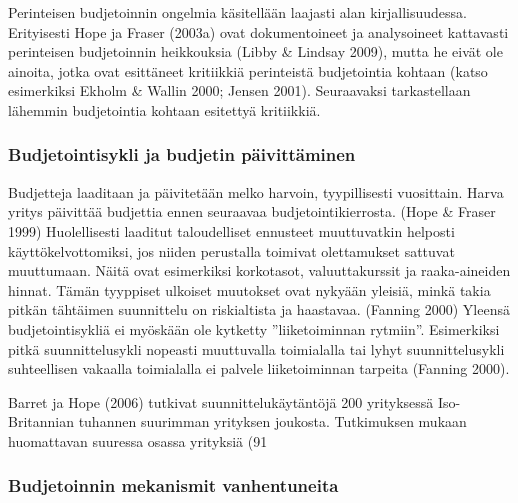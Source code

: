 \documentclass[12pt,a4paper,oneside,pdftex]{report}
\begin{document}
Perinteisen budjetoinnin ongelmia käsitellään laajasti alan kirjallisuudessa. Erityisesti Hope ja Fraser (2003a) ovat dokumentoineet ja analysoineet kattavasti perinteisen budjetoinnin heikkouksia (Libby & Lindsay 2009), mutta he eivät ole ainoita, jotka ovat esittäneet kritiikkiä perinteistä budjetointia kohtaan (katso esimerkiksi Ekholm & Wallin 2000; Jensen 2001). Seuraavaksi tarkastellaan lähemmin budjetointia kohtaan esitettyä kritiikkiä.

\subsubsection{Budjetointisykli ja budjetin päivittäminen}

Budjetteja laaditaan ja päivitetään melko harvoin, tyypillisesti vuosittain. Harva yritys päivittää budjettia ennen seuraavaa budjetointikierrosta. (Hope & Fraser 1999) Huolellisesti laaditut taloudelliset ennusteet muuttuvatkin helposti käyttökelvottomiksi, jos niiden perustalla toimivat olettamukset sattuvat muuttumaan. Näitä ovat esimerkiksi korkotasot, valuuttakurssit ja raaka-aineiden hinnat. Tämän tyyppiset ulkoiset muutokset ovat nykyään yleisiä, minkä takia pitkän tähtäimen suunnittelu on riskialtista ja haastavaa. (Fanning 2000) Yleensä budjetointisykliä ei myöskään ole kytketty ”liiketoiminnan rytmiin”. Esimerkiksi pitkä suunnittelusykli nopeasti muuttuvalla toimialalla tai lyhyt suunnittelusykli suhteellisen vakaalla toimialalla ei palvele liiketoiminnan tarpeita (Fanning 2000).

Barret ja Hope (2006) tutkivat suunnittelukäytäntöjä 200 yrityksessä Iso-Britannian tuhannen suurimman yrityksen joukosta. Tutkimuksen mukaan huomattavan suuressa osassa yrityksiä (91 %

\subsubsection{Budjetoinnin mekanismit vanhentuneita}
\end{document}
